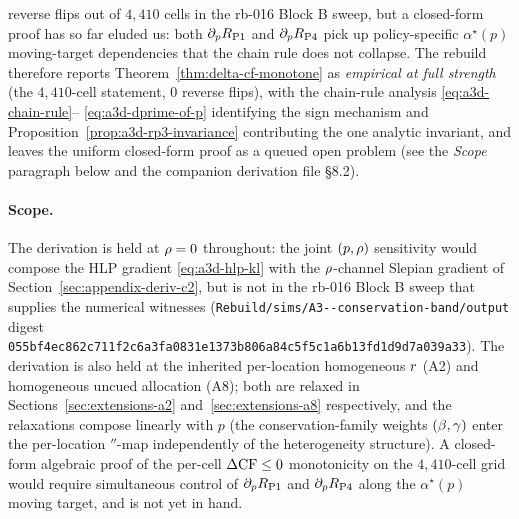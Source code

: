 reverse flips out of $4{,}410$ cells in the rb-016 Block B sweep,
but a closed-form proof has so far eluded us: both
$\partial_p R_{\mathrm{P1}}$ and $\partial_p R_{\mathrm{P4}}$ pick up
policy-specific $\alpha^\star(p)$ moving-target dependencies that
the chain rule does not collapse. The rebuild therefore reports
Theorem~\ref{thm:delta-cf-monotone} as \emph{empirical at full
strength} (the $4{,}410$-cell statement, $0$ reverse flips), with
the chain-rule analysis \eqref{eq:a3d-chain-rule}--%
\eqref{eq:a3d-dprime-of-p} identifying the sign mechanism and
Proposition~\ref{prop:a3d-rp3-invariance} contributing the one
analytic invariant, and leaves the uniform closed-form proof as a
queued open problem (see the \emph{Scope} paragraph below and the
companion derivation file §8.2).

\paragraph{Scope.}
The derivation is held at $\rho = 0$ throughout: the joint
$(p, \rho)$ sensitivity would compose the HLP gradient
\eqref{eq:a3d-hlp-kl} with the $\rho$-channel Slepian gradient
of Section~\ref{sec:appendix-deriv-c2}, but is not in the
rb-016 Block B sweep that supplies the numerical witnesses
(\texttt{Rebuild/sims/A3{-}{-}conservation-band/output} digest
\texttt{055bf4ec862c711f2c6a3fa0831e1373b806a84c5f5c1a6b13fd1d9d7a039a33}).
The derivation is also held at the inherited per-location
homogeneous $r$ (A2) and homogeneous uncued allocation (A8);
both are relaxed in Sections~\ref{sec:extensions-a2}
and~\ref{sec:extensions-a8} respectively, and the relaxations
compose linearly with $p$ (the conservation-family weights
$(\beta, \gamma)$ enter the per-location $\dprime$-map
independently of the heterogeneity structure). A closed-form
algebraic proof of the per-cell $\Delta\mathrm{CF} \le 0$ monotonicity on
the $4{,}410$-cell grid would require simultaneous control of
$\partial_p R_{\mathrm{P1}}$ and $\partial_p R_{\mathrm{P4}}$ along the
$\alpha^\star(p)$ moving target, and is not yet in hand.


